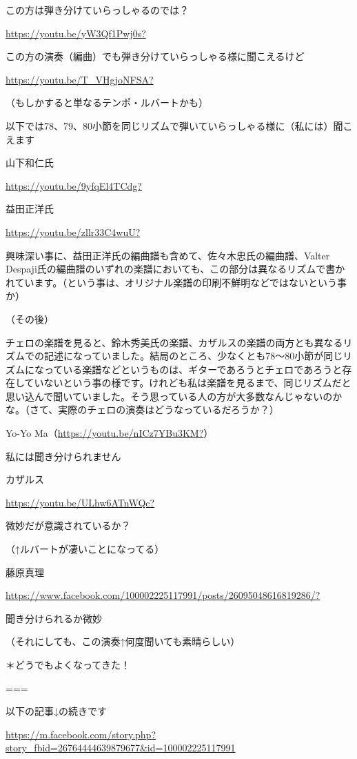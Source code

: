 この方は弾き分けていらっしゃるのでは？

\url{https://youtu.be/yW3Qf1Pwj0s?}

この方の演奏（編曲）でも弾き分けていらっしゃる様に聞こえるけど

\url{https://youtu.be/T_VHgjoNFSA?}

（もしかすると単なるテンポ・ルバートかも）

以下では78、79、80小節を同じリズムで弾いていらっしゃる様に（私には）聞こえます

山下和仁氏

\url{https://youtu.be/9yfqEl4TCdg?}

益田正洋氏

\url{https://youtu.be/zllr33C4wuU?}

興味深い事に、益田正洋氏の編曲譜も含めて、佐々木忠氏の編曲譜、Valter Despaji氏の編曲譜のいずれの楽譜においても、この部分は異なるリズムで書かれています。（という事は、オリジナル楽譜の印刷不鮮明などではないという事か）

（その後）

チェロの楽譜を見ると、鈴木秀美氏の楽譜、カザルスの楽譜の両方とも異なるリズムでの記述になっていました。結局のところ、少なくとも78〜80小節が同じリズムになっている楽譜などというものは、ギターであろうとチェロであろうと存在していないという事の様です。けれども私は楽譜を見るまで、同じリズムだと思い込んで聞いていました。そう思っている人の方が大多数なんじゃないのかな。（さて、実際のチェロの演奏はどうなっているだろうか？）

Yo-Yo Ma（\url{https://youtu.be/nICz7YBu3KM?}）

私には聞き分けられません

カザルス

\url{https://youtu.be/ULhw6ATnWQc?}

微妙だが意識されているか？

（↑ルバートが凄いことになってる）

藤原真理

\url{https://www.facebook.com/100002225117991/posts/26095048616819286/?}

聞き分けられるか微妙

（それにしても、この演奏↑何度聞いても素晴らしい）

＊どうでもよくなってきた！

===

以下の記事↓の続きです

\url{https://m.facebook.com/story.php?story_fbid=26764444639879677&id=100002225117991}

